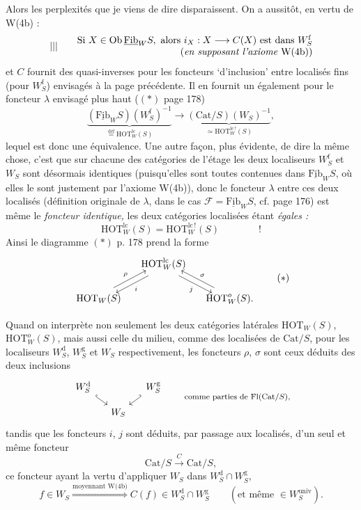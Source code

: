 \documentclass[11pt]{article}
\newcommand{\printedpage}[1]{\marginpar{\footnotesize p.~#1}}
\newcommand{\msp}[1]{\marginpar{\footnotesize [#1]}}
\newcommand{\HOT}{\mathrm{HOT}}
\newcommand{\Cat}{\mathrm{Cat}}
\newcommand{\Ob}{\mathrm{Ob}}
\newcommand{\Fib}{\underline{\mathrm{Fib}}}
\newcommand{\lcs}{\mathrm{lc}\,!}
\begin{document}
\printedpage{112}
Alors les perplexités que je viens de dire disparaissent. On a aussitôt, en vertu de W(4b) :
\[
|||\qquad
\begin{array}{@{}r@{}}
\text{Si } X \in \Ob\,\Fib_W S, \text{ alors } i_X : X \longrightarrow C(X) \text{ est dans } W^{\mathrm{f}}_S \\
(\textit{en supposant l’axiome } \text{W(4b)})
\end{array}
\]
et $C$ fournit des quasi-inverses pour les foncteurs ‘d’inclusion’ entre localisés fins (pour $W^{\mathrm{f}}_S$) envisagés à la page précédente. Il en fournit un également pour le foncteur $\lambda$ envisagé plus haut ($(\ast)$ page 178)
\[
\underbrace{(\Fib_W S)(W^{\mathrm{f}}_S)^{-1}}_{\overset{\text{déf}}{=}\HOT^{\mathrm{lc}}_W(S)} \longrightarrow \underbrace{(\Cat/S)(W_S)^{-1}}_{\simeq \HOT^{\lcs}_W(S)},
\]
lequel est donc une équivalence. Une autre façon, plus évidente, de dire la même chose, c’est que sur chacune des catégories de l’étage les deux localiseurs $W^{\mathrm{f}}_S$ et $W_S$ sont désormais identiques (puisqu’elles sont toutes contenues dans $\Fib_W S$, où elles le sont justement par l’axiome W(4b)), donc le foncteur $\lambda$ entre ces deux localisés (définition originale de $\lambda$, dans le cas $\mathcal{F} = \Fib_W S$, cf. page 176) est même le \textit{foncteur identique,} les deux catégories localisées étant \textit{égales :}
\[
\HOT^{\mathrm{lc}}_W(S) = \HOT^{\lcs}_W(S) \qquad\qquad !
\]
Ainsi le diagramme $(\ast)$ p. 178 prend la forme
\[
\begin{tikzcd}[column sep=small]
 & \HOT^{\mathrm{lc}}_W(S) \arrow[dl, shift left=1.2, "i"] \arrow[dr, shift right=1.2, "j"'] & \\
\HOT_W(S) \arrow[ur, shift left=1.2, "\rho"] & & \HOT^{o}_W(S). \arrow[ul, shift right=1.2, "\sigma"']
\end{tikzcd}
\tag*{$(\ast)$}
\]

\noindent\msp{page 182}
Quand on interprète non seulement les deux catégories latérales $\HOT_W(S)$, $\HOT^{o}_W(S)$, mais aussi celle du milieu, comme des localisées de $\Cat/S$, pour les localiseurs $W^{\mathrm{d}}_S$, $W^{\mathrm{g}}_S$ et $W_S$ respectivement, les foncteurs $\rho$, $\sigma$ sont ceux déduits des deux inclusions
\[
\begin{tikzcd}[column sep=small, row sep=small]
W^{\mathrm{d}}_S \arrow[dr, hook] & & W^{\mathrm{g}}_S \arrow[dl, hook'] \\
 & W_S &
\end{tikzcd}
\qquad \text{\footnotesize comme parties de Fl(Cat/$S$),}
\]
tandis que les foncteurs $i$, $j$ sont déduits, par passage aux localisés, d’un seul et même foncteur
\[
\Cat/S \xrightarrow{C} \Cat/S,
\]
ce foncteur ayant la vertu d’appliquer $W_S$ dans $W^{\mathrm{d}}_S \cap W^{\mathrm{g}}_S$,
\[
f \in W_S \overset{\text{moyennant W(4b)}}{\Longrightarrow} C(f) \in W^{\mathrm{d}}_S \cap W^{\mathrm{g}}_S \qquad (\text{et même } \in W^{\mathrm{univ}}_S).
\]
\end{document}
